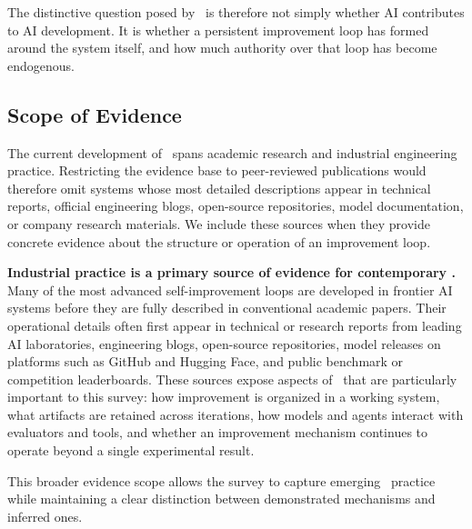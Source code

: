 
The distinctive question posed by \RSI \ is therefore not simply whether AI contributes to AI development. It is whether a persistent improvement loop has formed around the system itself, and how much authority over that loop has become endogenous.

\subsection{Scope of Evidence}
The current development of \RSI \ spans academic research and industrial engineering practice. Restricting the evidence base to peer-reviewed publications would therefore omit systems whose most detailed descriptions appear in technical reports, official engineering blogs, open-source repositories, model documentation, or company research materials. We include these sources when they provide concrete evidence about the structure or operation of an improvement loop.

\noindent\textbf{Industrial practice is a primary source of evidence for contemporary \RSI.} Many of the most advanced self-improvement loops are developed in frontier AI systems before they are fully described in conventional academic papers. Their operational details often first appear in technical or research reports from leading AI laboratories, engineering blogs, open-source repositories, model releases on platforms such as GitHub and Hugging Face, and public benchmark or competition leaderboards. These sources expose aspects of \RSI\ that are particularly important to this survey: how improvement is organized in a working system, what artifacts are retained across iterations, how models and agents interact with evaluators and tools, and whether an improvement mechanism continues to operate beyond a single experimental result.

This broader evidence scope allows the survey to capture emerging \RSI\ practice while maintaining a clear distinction between demonstrated mechanisms and inferred ones.

